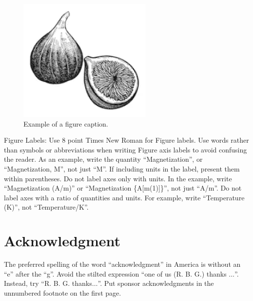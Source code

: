\documentclass[conference]{IEEEtran}
\begin{document}
\begin{figure}[htbp]
\centerline{\includegraphics{fig1.png}}
\caption{Example of a figure caption.}
\label{fig}
\end{figure}

Figure Labels: Use 8 point Times New Roman for Figure labels. Use words 
rather than symbols or abbreviations when writing Figure axis labels to 
avoid confusing the reader. As an example, write the quantity 
``Magnetization'', or ``Magnetization, M'', not just ``M''. If including 
units in the label, present them within parentheses. Do not label axes only 
with units. In the example, write ``Magnetization (A/m)'' or ``Magnetization 
\{A[m(1)]\}'', not just ``A/m''. Do not label axes with a ratio of 
quantities and units. For example, write ``Temperature (K)'', not 
``Temperature/K''.

\section*{Acknowledgment}

The preferred spelling of the word ``acknowledgment'' in America is without 
an ``e'' after the ``g''. Avoid the stilted expression ``one of us (R. B. 
G.) thanks $\ldots$''. Instead, try ``R. B. G. thanks$\ldots$''. Put sponsor 
acknowledgments in the unnumbered footnote on the first page.



\end{document}
